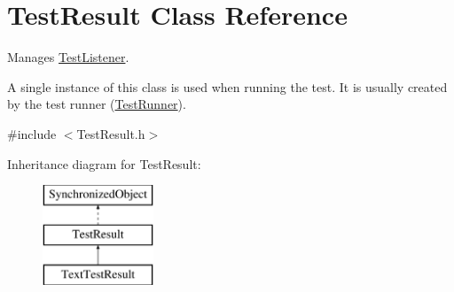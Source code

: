 \hypertarget{class_test_result}{\section{Test\-Result Class Reference}
\label{class_test_result}
}


Manages \hyperlink{class_test_listener}{Test\-Listener}.

A single instance of this class is used when running the test. It is usually created by the test runner (\hyperlink{class_test_runner}{Test\-Runner}).  




{\ttfamily \#include $<$Test\-Result.\-h$>$}

Inheritance diagram for Test\-Result\-:\begin{figure}[H]
\begin{center}
\leavevmode
\includegraphics[height=3.000000cm]{class_test_result}
\end{center}
\end{figure}
